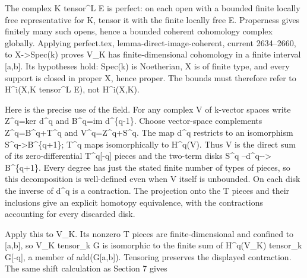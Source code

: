 The complex K tensor\^{}L E is perfect:\allowbreak{} on each open with a bounded finite locally free representative for K,\allowbreak{} tensor it with the finite locally free E. Properness gives finitely many such opens,\allowbreak{} hence a bounded coherent cohomology complex globally. Applying perfect.tex,\allowbreak{} lemma-direct-image-coherent,\allowbreak{} current 2634–\allowbreak{}2660,\allowbreak{} to X\allowbreak{}->Spec(k)\allowbreak{} proves V\_\allowbreak{}K has finite-dimensional cohomology in a finite interval [a,\allowbreak{}b]\allowbreak{}. Its hypotheses hold:\allowbreak{} Spec(k)\allowbreak{} is Noetherian,\allowbreak{} X is of finite type,\allowbreak{} and every support is closed in proper X,\allowbreak{} hence proper. The bounds must therefore refer to H\textasciicircum{}i(X,\allowbreak{}K tensor\^{}L E)\allowbreak{},\allowbreak{} not H\textasciicircum{}i(X,\allowbreak{}K)\allowbreak{}.

Here is the precise use of the field. For any complex V of k-vector spaces write Z\textasciicircum{}q\allowbreak{}=ker d\^{}q and B\textasciicircum{}q\allowbreak{}=im d\^{}\{q-1\}. Choose vector-space complements Z\textasciicircum{}q\allowbreak{}=B\textasciicircum{}q\allowbreak{}+T\textasciicircum{}q and V\textasciicircum{}q\allowbreak{}=Z\textasciicircum{}q\allowbreak{}+S\textasciicircum{}q. The map d\^{}q restricts to an isomorphism S\textasciicircum{}q\allowbreak{}->B\textasciicircum{}\{q\allowbreak{}+1\}; T\^{}q maps isomorphically to H\textasciicircum{}q(V)\allowbreak{}. Thus V is the direct sum of its zero-differential T\textasciicircum{}q[-q]\allowbreak{} pieces and the two-term disks S\^{}q --d\textasciicircum{}q-\allowbreak{}-> B\textasciicircum{}\{q\allowbreak{}+1\}. Every degree has just the stated finite number of types of pieces,\allowbreak{} so this decomposition is well-defined even when V itself is unbounded. On each disk the inverse of d\^{}q is a contraction. The projection onto the T pieces and their inclusions give an explicit homotopy equivalence,\allowbreak{} with the contractions accounting for every discarded disk.

Apply this to V\_\allowbreak{}K. Its nonzero T pieces are finite-dimensional and confined to [a,\allowbreak{}b]\allowbreak{},\allowbreak{} so V\_\allowbreak{}K tensor\_\allowbreak{}k G is isomorphic to the finite sum of H\textasciicircum{}q(V\_\allowbreak{}K)\allowbreak{} tensor\_\allowbreak{}k G[-q]\allowbreak{},\allowbreak{} a member of add(G[a,\allowbreak{}b]\allowbreak{})\allowbreak{}. Tensoring preserves the displayed contraction. The same shift calculation as Section 7 gives

